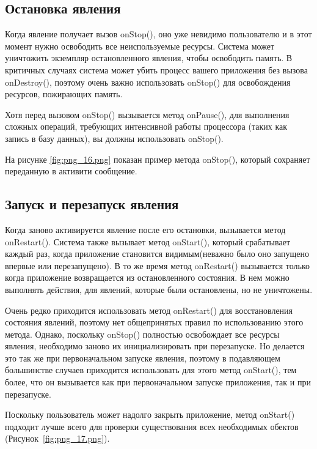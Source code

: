 \subsection{Остановка явления}
Когда явление получает вызов onStop(), оно уже невидимо пользователю и
в этот момент нужно освободить все неиспользуемые ресурсы. Система может
уничтожить экземпляр остановленного явления, чтобы освободить память. В
критичных случаях система может убить процесс вашего приложения без
вызова onDestroy(), поэтому очень важно использовать onStop() для
освобождения ресурсов, пожирающих память.\par
Хотя перед вызовом onStop() вызывается метод onPause(), для выполнения
сложных операций, требующих интенсивной работы процессора (таких как
запись в базу данных), вы должны использовать onStop().\par
На рисунке \ref{fig:png_16.png} показан пример метода onStop(),
который сохраняет переданную в активити сообщение.


\subsection{Запуск и перезапуск явления}
Когда заново активируется явление после его остановки, вызывается метод
onRestart(). Система также вызывает метод onStart(), который срабатывает
каждый раз, когда приложение становится видимым(неважно было оно
запущено впервые или перезапущено). В то же время метод onRestart()
вызывается только когда приложение возвращается из остановленного
состояния. В нем можно выполнять действия, для явлений, которые были
остановлены, но не уничтожены.\par
Очень редко приходится использовать метод onRestart() для восстановления
состояния явлений, поэтому нет общепринятых правил по использованию
этого метода. Однако, поскольку onStop() полностью освобождает все
ресурсы явления, необходимо заново их инициализировать при
перезапуске. Но делается это так же при первоначальном запуске явления,
поэтому в подавляющем большинстве случаев приходится использовать для
этого метод onStart(), тем более, что он вызывается как при первоначальном
запуске приложения, так и при перезапуске.\par
Поскольку пользователь может надолго закрыть приложение, метод
onStart() подходит лучше всего для проверки существования всех
необходимых обектов (Рисунок~\ref{fig:png_17.png}).


